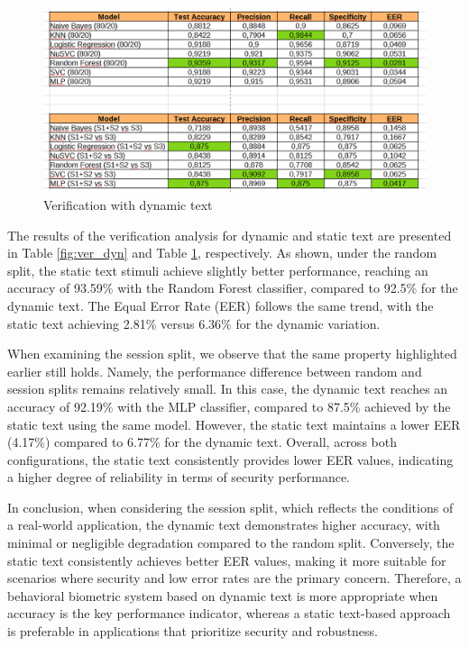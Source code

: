 \documentclass{article}
\begin{document}
\begin{figure}[ht]
    \centering
    \includegraphics[width = 0.6
    \textwidth]{Images/Results/Static_Dynamic/Ver_stat.png}
    \caption{Verification with dynamic text}
    \label{fig:ver_stat}
\end{figure}

The results of the verification analysis for dynamic and static text are presented in Table \ref{fig:ver_dyn} and Table \ref{fig:ver_stat}, respectively.
As shown, under the random split, the static text stimuli achieve slightly better performance, reaching an accuracy of 93.59\% with the Random Forest classifier, compared to 92.5\% for the dynamic text. 
The Equal Error Rate (EER) follows the same trend, with the static text achieving 2.81\% versus 6.36\% for the dynamic variation.

When examining the session split, we observe that the same property highlighted earlier still holds.
Namely, the performance difference between random and session splits remains relatively small.
In this case, the dynamic text reaches an accuracy of 92.19\% with the MLP classifier, compared to 87.5\% achieved by the static text using the same model. 
However, the static text maintains a lower EER (4.17\%) compared to 6.77\% for the dynamic text.
Overall, across both configurations, the static text consistently provides lower EER values, indicating a higher degree of reliability in terms of security performance.

In conclusion, when considering the session split, which reflects the conditions of a real-world application, the dynamic text demonstrates higher accuracy, with minimal or negligible degradation compared to the random split.
Conversely, the static text consistently achieves better EER values, making it more suitable for scenarios where security and low error rates are the primary concern.
Therefore, a behavioral biometric system based on dynamic text is more appropriate when accuracy is the key performance indicator, whereas a static text-based approach is preferable in applications that prioritize security and robustness.
\end{document}
